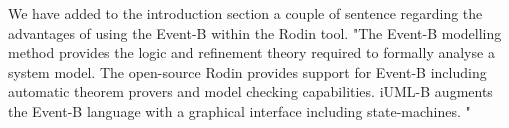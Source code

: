 \documentclass{response}
\begin{document}
\begin{comment}{Reviewer \#2}
  The goal appears to be to try to create something that resembles
  StateCharts but is bound to the semantics of Event-B.  In this case,
  the authors should also justify why Event-B is a suitable language
  for representing Statecharts behavior.  In this case, it appeared
  that the target language made some aspects of behavior difficult to
  formalize.  
\end{comment}

\begin{response}
  We have added to the introduction section a couple of sentence regarding the advantages of using 
  the Event-B within the Rodin tool.
  "The Event-B modelling method provides the logic and refinement theory required to formally analyse a system model.  The open-source Rodin provides support for Event-B including automatic theorem provers and model checking capabilities. iUML-B augments the Event-B language with a graphical interface including state-machines.  "
\end{response}

\begin{comment}{Reviewer \#2}
  In addition, I would have liked a more formal description of the
  translation, or at least a reference to a more formal description of
  the translation than the prose description of different model
  aspects.  
\end{comment}

\begin{response}
\end{response}





\begin{comment}{Reviewer \#3}
  Page 1:

  * Line -2, it says:

  "While functional properties (usually) can be tested, safety,
  security and reliability properties
  (usually) must be proved formally."

  "Can" ... and ... "must" ... why?
\end{comment}
\end{document}

